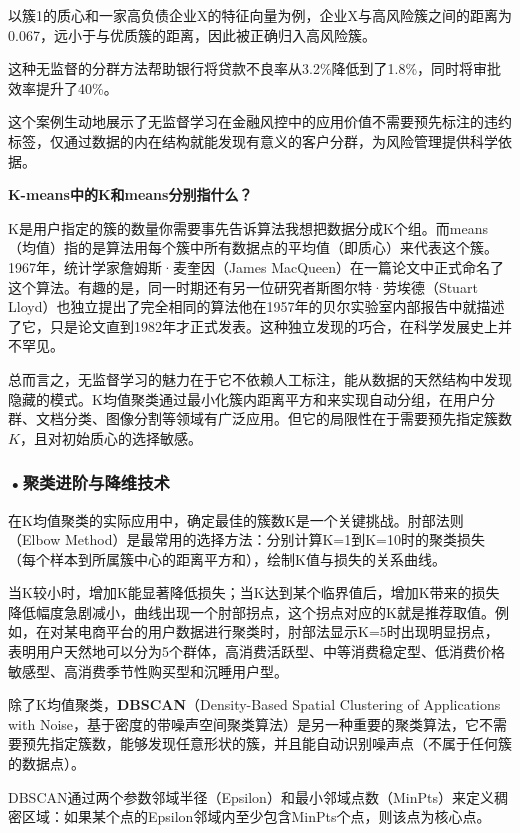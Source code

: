 以簇1的质心和一家高负债企业X的特征向量为例，企业X与高风险簇之间的距离为0.067，远小于与优质簇的距离，因此被正确归入高风险簇。

这种无监督的分群方法帮助银行将贷款不良率从3.2\%降低到了1.8\%，同时将审批效率提升了40\%。

这个案例生动地展示了无监督学习在金融风控中的应用价值不需要预先标注的违约标签，仅通过数据的内在结构就能发现有意义的客户分群，为风险管理提供科学依据。

\begin{knowledgebox}
\small
\textbf{K-means中的K和means分别指什么？}

 K是用户指定的簇的数量你需要事先告诉算法我想把数据分成K个组。而means（均值）指的是算法用每个簇中所有数据点的平均值（即质心）来代表这个簇。1967年，统计学家詹姆斯·麦奎因（James MacQueen）在一篇论文中正式命名了这个算法。有趣的是，同一时期还有另一位研究者斯图尔特·劳埃德（Stuart Lloyd）也独立提出了完全相同的算法他在1957年的贝尔实验室内部报告中就描述了它，只是论文直到1982年才正式发表。这种独立发现的巧合，在科学发展史上并不罕见。
\end{knowledgebox}

总而言之，无监督学习的魅力在于它不依赖人工标注，能从数据的天然结构中发现隐藏的模式。K均值聚类通过最小化簇内距离平方和来实现自动分组，在用户分群、文档分类、图像分割等领域有广泛应用。但它的局限性在于需要预先指定簇数$K$，且对初始质心的选择敏感。

\subsubsection*{\textbf{•聚类进阶与降维技术}}

在K均值聚类的实际应用中，确定最佳的簇数K是一个关键挑战。肘部法则（Elbow Method）是最常用的选择方法：分别计算K=1到K=10时的聚类损失（每个样本到所属簇中心的距离平方和），绘制K值与损失的关系曲线。

当K较小时，增加K能显著降低损失；当K达到某个临界值后，增加K带来的损失降低幅度急剧减小，曲线出现一个肘部拐点，这个拐点对应的K就是推荐取值。例如，在对某电商平台的用户数据进行聚类时，肘部法显示K=5时出现明显拐点，表明用户天然地可以分为5个群体，高消费活跃型、中等消费稳定型、低消费价格敏感型、高消费季节性购买型和沉睡用户型。

除了K均值聚类，\textbf{DBSCAN}（Density-Based Spatial Clustering of Applications with Noise，基于密度的带噪声空间聚类算法）是另一种重要的聚类算法，它不需要预先指定簇数，能够发现任意形状的簇，并且能自动识别噪声点（不属于任何簇的数据点）。

DBSCAN通过两个参数邻域半径（Epsilon）和最小邻域点数（MinPts）来定义稠密区域：如果某个点的Epsilon邻域内至少包含MinPts个点，则该点为核心点。


